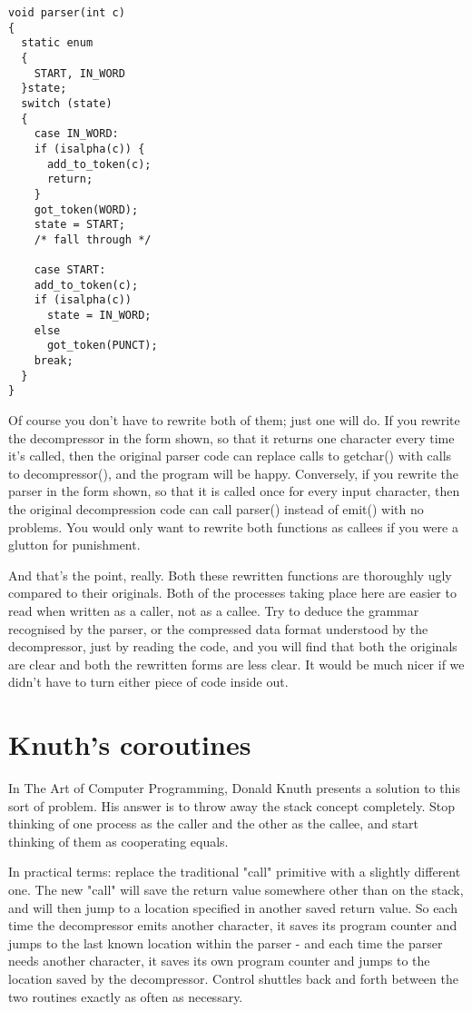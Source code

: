 \documentclass[12pt]{article}
\begin{document}
\begin{CJK}{UTF8}{bsmi}
\begin{multicols}{2}
\begin{lstlisting}[caption=parsesr, basicstyle=\footnotesize]
void parser(int c) 
{
  static enum 
  {
    START, IN_WORD
  }state;
  switch (state) 
  {
    case IN_WORD:
    if (isalpha(c)) {
      add_to_token(c);
      return;
    }
    got_token(WORD);
    state = START;
    /* fall through */

    case START:
    add_to_token(c);
    if (isalpha(c))
      state = IN_WORD;
    else
      got_token(PUNCT);
    break;
  }
}
\end{lstlisting}
\end{multicols}

 Of course you don't have to rewrite both of them; just one will do. If you rewrite the decompressor in the form shown, so that it returns one character every time it's called, then the original parser code can replace calls to getchar() with calls to decompressor(), and the program will be happy. Conversely, if you rewrite the parser in the form shown, so that it is called once for every input character, then the original decompression code can call parser() instead of emit() with no problems. You would only want to rewrite both functions as callees if you were a glutton for punishment.

 And that's the point, really. Both these rewritten functions are thoroughly ugly compared to their originals. Both of the processes taking place here are easier to read when written as a caller, not as a callee. Try to deduce the grammar recognised by the parser, or the compressed data format understood by the decompressor, just by reading the code, and you will find that both the originals are clear and both the rewritten forms are less clear. It would be much nicer if we didn't have to turn either piece of code inside out.

\section{Knuth's coroutines}
 In The Art of Computer Programming, Donald Knuth presents a solution to this sort of problem. His answer is to throw away the stack concept completely. Stop thinking of one process as the caller and the other as the callee, and start thinking of them as cooperating equals.

 In practical terms: replace the traditional "call" primitive with a slightly different one. The new "call" will save the return value somewhere other than on the stack, and will then jump to a location specified in another saved return value. So each time the decompressor emits another character, it saves its program counter and jumps to the last known location within the parser - and each time the parser needs another character, it saves its own program counter and jumps to the location saved by the decompressor. Control shuttles back and forth between the two routines exactly as often as necessary.


\end{CJK}
\end{document}
